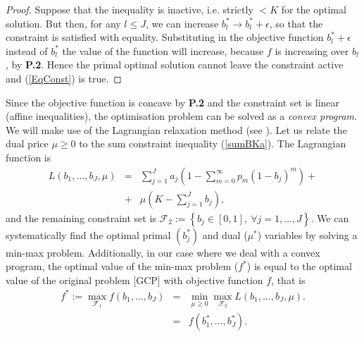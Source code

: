\documentclass[conference,twocolum,final]{IEEEtran}
\begin{document}
\begin{proof} Suppose that the inequality is inactive, i.e. strictly $<K$ for the optimal solution. But then, for any $l\leq J$, we can increase $b_l^*\rightarrow b_l^*+\epsilon$, so that the constraint is satisfied with equality. Substituting in the objective function $b_l^*+\epsilon$ instead of $b_l^*$ the value of the function will increase, because $f$ is increasing over $b_l$, by \textbf{P.2}. Hence the primal optimal solution cannot leave the constraint active and (\ref{EqConst}) is true.
\end{proof}
Since the objective function is concave by \textbf{P.2} and the constraint set is linear (affine inequalities), the optimisation problem can be solved as a \textit{convex program}. We will make use of the Lagrangian relaxation method (see \cite{BoydBook}). Let us relate the dual price $\mu\geq 0$ to the sum constraint inequality (\ref{sumBKa}). The Lagrangian function is \begin{eqnarray}
\label{LagPerfMe}
L\left(b_1,\ldots,b_J,\mu\right) & = & \sum_{j=1}^Ja_j\left(1-\sum_{m=0}^{\infty}p_m\left(1-b_j\right)^{m}\right)+\nonumber\\
& +& \mu\left(K-\sum_{j=1}^Jb_j\right),
\end{eqnarray}
and the remaining constraint set is 
$\mathcal{F}_2:=\left\{ b_j\in\left[0,1\right], \ \forall j=1,\ldots,J\right\}$.
We can systematically find the optimal primal $(b_j^*)$ and dual ($\mu^*$) variables by solving a min-max problem. Additionally, in our case where we deal with a convex program, the optimal value of the min-max problem ($f^*$) is equal to the optimal value of the original problem [GCP] with objective function $f$, that is
\begin{eqnarray}
\label{MinMaxL}
f^*:=\max_{\mathcal{F}_1} f\left(b_1,\ldots,b_J\right) & = & \min_{\mu\geq 0}\max_{\mathcal{F}_2}L\left(b_1,\ldots,b_J,\mu\right).\nonumber\\
 & = & f\left(b_1^*,\ldots,b_J^*\right).
\end{eqnarray}
\end{document}
